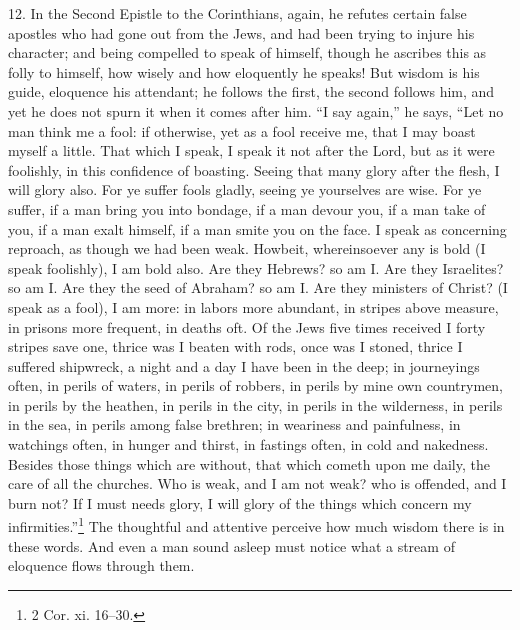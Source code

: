 12. In the Second Epistle to the Corinthians, again, he refutes certain false apostles who had gone out from the Jews, and had been trying to injure his character; and being compelled to speak of himself, though he ascribes this as folly to himself, how wisely and how eloquently he speaks! But wisdom is his guide, eloquence his attendant; he follows the first, the second follows him, and yet he does not spurn it when it comes after him. “I say again,” he says, “Let no man think me a fool: if otherwise, yet as a fool receive me, that I may boast myself a little. That which I speak, I speak it not after the Lord, but as it were foolishly, in this confidence of boasting. Seeing that many glory after the flesh, I will glory also. For ye suffer fools gladly, seeing ye yourselves are wise. For ye suffer, if a man bring you into bondage, if a man devour you, if a man take of you, if a man exalt himself, if a man smite you on the face. I speak as concerning reproach, as though we had been weak. Howbeit, whereinsoever any is bold (I speak foolishly), I am bold also. Are they Hebrews? so am I. Are they Israelites? so am I. Are they the seed of Abraham? so am I. Are they ministers of Christ? (I speak as a fool), I am more: in labors more abundant, in stripes above measure, in prisons more frequent, in deaths oft. Of the Jews five times received I forty stripes save one, thrice was I beaten with rods, once was I stoned, thrice I suffered shipwreck, a night and a day I have been in the deep; in journeyings often, in perils of waters, in perils of robbers, in perils by mine own countrymen, in perils by the heathen, in perils in the city, in perils in the wilderness, in perils in the sea, in perils among false brethren; in weariness and painfulness, in watchings often, in hunger and thirst, in fastings often, in cold and nakedness. Besides those things which are without, that which cometh upon me daily, the care of all the churches. Who is weak, and I am not weak? who is offended, and I burn not? If I must needs glory, I will glory of the things which concern my infirmities.”\footnote{2 Cor. xi. 16–30.} The thoughtful and attentive perceive how much wisdom there is in these words. And even a man sound asleep must notice what a stream of eloquence flows through them.

